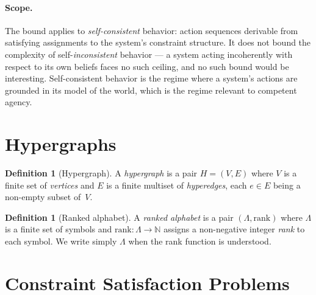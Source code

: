 \documentclass[11pt,a4paper]{article}
\theoremstyle{plain}
\theoremstyle{definition}
\newtheorem{definition}[theorem]{Definition}
\theoremstyle{remark}
\begin{document}
\paragraph{Scope.}
The bound applies to \emph{self-consistent} behavior: action sequences derivable from satisfying assignments to the system's constraint structure.
It does not bound the complexity of self-\emph{inconsistent} behavior --- a system acting incoherently with respect to its own beliefs faces no such ceiling, and no such bound would be interesting.
Self-consistent behavior is the regime where a system's actions are grounded in its model of the world, which is the regime relevant to competent agency.

\section{Hypergraphs}\label{sec:hypergraph}

\begin{definition}[Hypergraph]\label{def:hypergraph-basic}
A \emph{hypergraph} is a pair $H = (V, E)$ where $V$ is a finite set of \emph{vertices} and $E$ is a finite multiset of \emph{hyperedges}, each $e \in E$ being a non-empty subset of~$V$.
\end{definition}

\begin{definition}[Ranked alphabet]\label{def:ranked-alphabet}
A \emph{ranked alphabet} is a pair $(\Lambda, \mathrm{rank})$ where $\Lambda$ is a finite set of symbols and $\mathrm{rank}\colon \Lambda \to \mathbb{N}$ assigns a non-negative integer \emph{rank} to each symbol.
We write simply $\Lambda$ when the rank function is understood.
\end{definition}

\section{Constraint Satisfaction Problems}\label{sec:csp}
\end{document}
